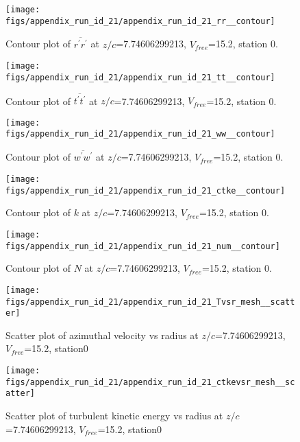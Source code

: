 \begin{figure}[H]
\centering
\texttt{[image: figs/appendix\_run\_id\_21/appendix\_run\_id\_21\_rr\_\_contour]}
\caption{Contour plot of $\overline{r^\prime r^\prime}$ at $z/c$=7.74606299213, $V_{free}$=15.2, station 0.}
\label{fig:appendix_run_id_21_rr__contour}
\end{figure}


\begin{figure}[H]
\centering
\texttt{[image: figs/appendix\_run\_id\_21/appendix\_run\_id\_21\_tt\_\_contour]}
\caption{Contour plot of $\overline{t^\prime t^\prime}$ at $z/c$=7.74606299213, $V_{free}$=15.2, station 0.}
\label{fig:appendix_run_id_21_tt__contour}
\end{figure}


\begin{figure}[H]
\centering
\texttt{[image: figs/appendix\_run\_id\_21/appendix\_run\_id\_21\_ww\_\_contour]}
\caption{Contour plot of $\overline{w^\prime w^\prime}$ at $z/c$=7.74606299213, $V_{free}$=15.2, station 0.}
\label{fig:appendix_run_id_21_ww__contour}
\end{figure}


\begin{figure}[H]
\centering
\texttt{[image: figs/appendix\_run\_id\_21/appendix\_run\_id\_21\_ctke\_\_contour]}
\caption{Contour plot of $k$ at $z/c$=7.74606299213, $V_{free}$=15.2, station 0.}
\label{fig:appendix_run_id_21_ctke__contour}
\end{figure}


\begin{figure}[H]
\centering
\texttt{[image: figs/appendix\_run\_id\_21/appendix\_run\_id\_21\_num\_\_contour]}
\caption{Contour plot of $N$ at $z/c$=7.74606299213, $V_{free}$=15.2, station 0.}
\label{fig:appendix_run_id_21_num__contour}
\end{figure}


\begin{figure}[H]
\centering
\texttt{[image: figs/appendix\_run\_id\_21/appendix\_run\_id\_21\_Tvsr\_mesh\_\_scatter]}
\caption{Scatter plot of azimuthal velocity vs radius at $z/c$=7.74606299213, $V_{free}$=15.2, station0}
\label{fig:appendix_run_id_21_Tvsr_mesh__scatter}
\end{figure}


\begin{figure}[H]
\centering
\texttt{[image: figs/appendix\_run\_id\_21/appendix\_run\_id\_21\_ctkevsr\_mesh\_\_scatter]}
\caption{Scatter plot of turbulent kinetic energy vs radius at $z/c$=7.74606299213, $V_{free}$=15.2, station0}
\label{fig:appendix_run_id_21_ctkevsr_mesh__scatter}
\end{figure}


